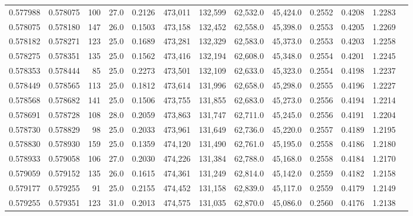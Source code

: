 \begin{tabular}{rrrrrrrrrrrrr}
0.577988 & 0.578075 &   100 & 27.0 &                                     0.2126 & 473,011 & 132,599 &  62,532.0 &  45,424.0 & 0.2552 & 0.4208 & 1.2283 \\
0.578075 & 0.578180 &   147 & 26.0 &                                     0.1503 & 473,158 & 132,452 &  62,558.0 &  45,398.0 & 0.2553 & 0.4205 & 1.2269 \\
0.578182 & 0.578271 &   123 & 25.0 &                                     0.1689 & 473,281 & 132,329 &  62,583.0 &  45,373.0 & 0.2553 & 0.4203 & 1.2258 \\
0.578275 & 0.578351 &   135 & 25.0 &                                     0.1562 & 473,416 & 132,194 &  62,608.0 &  45,348.0 & 0.2554 & 0.4201 & 1.2245 \\
0.578353 & 0.578444 &    85 & 25.0 &                                     0.2273 & 473,501 & 132,109 &  62,633.0 &  45,323.0 & 0.2554 & 0.4198 & 1.2237 \\
0.578449 & 0.578565 &   113 & 25.0 &                                     0.1812 & 473,614 & 131,996 &  62,658.0 &  45,298.0 & 0.2555 & 0.4196 & 1.2227 \\
0.578568 & 0.578682 &   141 & 25.0 &                                     0.1506 & 473,755 & 131,855 &  62,683.0 &  45,273.0 & 0.2556 & 0.4194 & 1.2214 \\
0.578691 & 0.578728 &   108 & 28.0 &                                     0.2059 & 473,863 & 131,747 &  62,711.0 &  45,245.0 & 0.2556 & 0.4191 & 1.2204 \\
0.578730 & 0.578829 &    98 & 25.0 &                                     0.2033 & 473,961 & 131,649 &  62,736.0 &  45,220.0 & 0.2557 & 0.4189 & 1.2195 \\
0.578830 & 0.578930 &   159 & 25.0 &                                     0.1359 & 474,120 & 131,490 &  62,761.0 &  45,195.0 & 0.2558 & 0.4186 & 1.2180 \\
0.578933 & 0.579058 &   106 & 27.0 &                                     0.2030 & 474,226 & 131,384 &  62,788.0 &  45,168.0 & 0.2558 & 0.4184 & 1.2170 \\
0.579059 & 0.579152 &   135 & 26.0 &                                     0.1615 & 474,361 & 131,249 &  62,814.0 &  45,142.0 & 0.2559 & 0.4182 & 1.2158 \\
0.579177 & 0.579255 &    91 & 25.0 &                                     0.2155 & 474,452 & 131,158 &  62,839.0 &  45,117.0 & 0.2559 & 0.4179 & 1.2149 \\
0.579255 & 0.579351 &   123 & 31.0 &                                     0.2013 & 474,575 & 131,035 &  62,870.0 &  45,086.0 & 0.2560 & 0.4176 & 1.2138 \\

\end{tabular}
